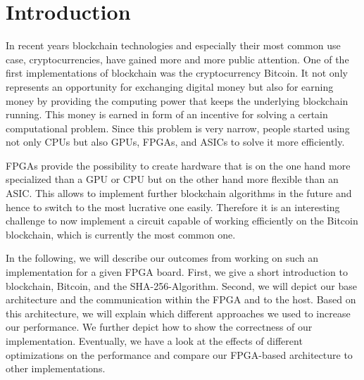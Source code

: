 \section{Introduction}

In recent years blockchain technologies and especially their most common use case, cryptocurrencies, have gained more and more public attention.
One of the first implementations of blockchain was the cryptocurrency Bitcoin.
It not only represents an opportunity for exchanging digital money but also for earning money by providing the computing power that keeps the underlying blockchain running. 
This money is earned in form of an incentive for solving a certain computational problem.
Since this problem is very narrow, people started using not only CPUs but also GPUs, FPGAs, and ASICs to solve it more efficiently.

FPGAs provide the possibility to create hardware that is on the one hand more specialized than a GPU or CPU but on the other hand more flexible than an ASIC. This allows to implement further blockchain algorithms in the future and hence to switch to the most lucrative one easily. Therefore it is an interesting challenge to now implement a circuit capable of working efficiently on the Bitcoin blockchain, which is currently the most common one.


In the following, we will describe our outcomes from working on such an implementation for a given FPGA board.
First, we give a short introduction to blockchain, Bitcoin, and the SHA-256-Algorithm.
Second, we will depict our base architecture and the communication within the FPGA and to the host.
Based on this architecture, we will explain which different approaches we used to increase our performance.
We further depict how to show the correctness of our implementation.
Eventually, we have a look at the effects of different optimizations on the performance and compare our FPGA-based architecture to other implementations.

